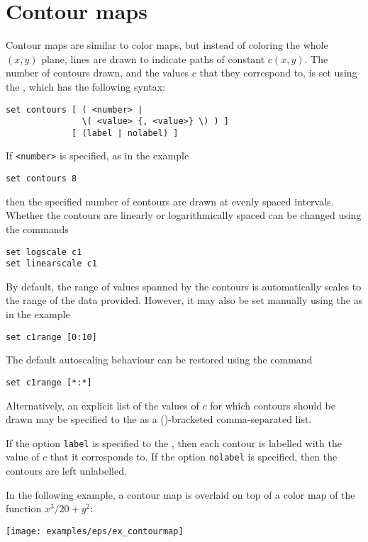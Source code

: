\section{Contour maps}
\label{sec:contourmaps}

Contour maps are similar to color maps, but instead of coloring the whole
$(x,y)$ plane, lines are drawn to indicate paths of constant $c(x,y)$. The
number of contours drawn, and the values $c$ that they correspond to, is set
using the , which has the following syntax:

\begin{verbatim}
set contours [ ( <number> |
               \( <value> {, <value>} \) ) ]
             [ (label | nolabel) ]
\end{verbatim}

If {\tt <number>} is specified, as in the example
\begin{verbatim}
set contours 8
\end{verbatim}
then the specified number of contours are drawn at evenly spaced intervals.
Whether the contours are linearly or logarithmically spaced can be changed
using the commands
\begin{verbatim}
set logscale c1
set linearscale c1
\end{verbatim}
By default, the range of values spanned by the contours is automatically scales
to the range of the data provided. However, it may also be set manually using
the  as in the example
\begin{verbatim}
set c1range [0:10]
\end{verbatim}
The default autoscaling behaviour can be restored using the command
\begin{verbatim}
set c1range [*:*]
\end{verbatim}

Alternatively, an explicit list of the values of $c$ for which contours should
be drawn may be specified to the  as a ()-bracketed
comma-separated list.

If the option {\tt label} is specified to the , then each
contour is labelled with the value of $c$ that it corresponds to. If the option
{\tt nolabel} is specified, then the contours are left unlabelled.

In the following example, a contour map is overlaid on top of a color map of
the function $x^3/20+y^2$:

\vspace{2mm}

\vspace{2mm}
\centerline{\texttt{[image: examples/eps/ex\_contourmap]}}
\vspace{2mm}

